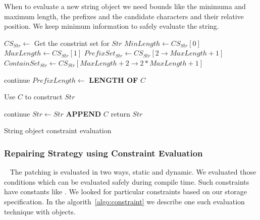 When to evaluate a new string object we need bounds like the minimuma and maximum
length, the prefixes and the candidate characters and their relative position.
We keep minimum information to safely evaluate the string.

\begin{algorithm}
\scriptsize
\DontPrintSemicolon
{}
\Begin
{
 $CS_{Str} \longleftarrow$ Get the constrint set for $Str$\;
 $MinLength \longleftarrow CS_{Str}[0]$\;
 $MaxLength \longleftarrow CS_{Str}[1]$\;
 $PrefixSet_{Str} \longleftarrow CS_{Str}[2 \rightarrow MaxLength + 1]$\;
 $ContainSet_{Str} \longleftarrow CS_{Str}[MaxLength +2  \rightarrow 2*MaxLength
 + 1]$\;
 
  {
   {
    continue\;
   }
   $PrefixLength \longleftarrow$ {\bf LENGTH OF} $C$\;
   
   {
     Use $C$ to construct $Str$\;
   }
  }
 
  {
   {
    continue\;
   }
   $Str \leftarrow Str$ {\bf APPEND} $C$\;
  }
  return $Str$\;
}
\caption{String object constraint evaluation}
 \label{algo:constraint}
\end{algorithm}

\subsubsection{Repairing Strategy using Constraint Evaluation}
\label{subsubsec:repairingStrategyConstraint}

~\newline
The patching is evaluated in two ways, static and dynamic. We evaluated those
conditions which can be evaluated safely during compile time. Such constraints
have constants like . We looked for particular
constraints based on our storage specification. In the algorith~\ref{algo:constraint}
we describe one such evaluation technique with  objects.


